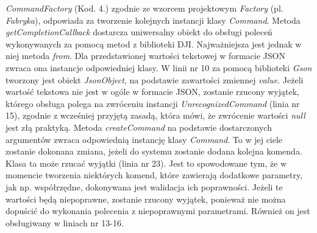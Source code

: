 \textit{CommandFactory} (Kod. 4.) zgodnie ze wzorcem projektowym \textit{Factory} (pl. \textit{Fabryka}), odpowiada za tworzenie kolejnych instancji klasy \textit{Command}. Metoda \textit{getCompletionCallback} dostarcza uniwersalny obiekt do obsługi poleceń wykonywanych za pomocą metod z biblioteki DJI. Najważniejsza jest jednak w niej metoda \textit{from}. Dla przedstawionej wartości tekstowej w formacie JSON zwraca ona instancje odpowiedniej klasy. W linii nr 10 za pomocą biblioteki \textit{Gson} tworzony jest obiekt \textit{JsonObject}, na podstawie zawartości zmiennej \textit{value}. Jeżeli wartość tekstowa nie jest w ogóle w formacie JSON, zostanie rzucony wyjątek, którego obsługa polega na zwróceniu instancji \textit{UnrecognizedCommand} (linia nr 15), zgodnie z wcześniej przyjętą zasadą, która mówi, że zwrócenie wartości \textit{null} jest złą praktyką. Metoda \textit{createCommand} na podstawie dostarczonych argumentów zwraca odpowiednią instancję klasy \textit{Command}. To w jej ciele zostanie dokonana zmiana, jeżeli do systemu zostanie dodana kolejna komenda. Klasa ta może rzucać wyjątki (linia nr 23). Jest to spowodowane tym, że w momencie tworzenia niektórych komend, które zawierają dodatkowe parametry, jak np. współrzędne, dokonywana jest walidacja ich poprawności. Jeżeli te wartości będą niepoprawne, zostanie rzucony wyjątek, ponieważ nie można dopuścić do wykonania polecenia z niepoprawnymi parametrami. Również on jest obsługiwany w liniach nr 13-16.


